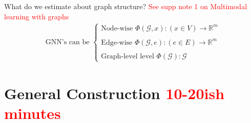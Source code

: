 \documentclass{beamer}
\newcommand{\Graph}{\mathcal{G}}
\newcommand{\NodeSet}{V}
\newcommand{\EdgeSet}{E}
\begin{document}
\begin{frame}{What do we estimate about graph structure?}
    \textcolor{red}{See supp note 1 on Multimodal learning with graphs}
    \begin{gather*}
        \text{GNN's can be }
        \begin{cases}
            \text{Node-wise }\Phi(\Graph, x): (x\in \NodeSet) \rightarrow \mathbb{R}^m 
            \\  \\ 
            \text{Edge-wise }\Phi(\Graph, e): (e\in \EdgeSet) \rightarrow \mathbb{R}^m  
            \\ \\ 
            \text{Graph-level level }\Phi(\Graph): \Graph %
            \end{cases}            
    \end{gather*}
\end{frame}

\section{General Construction \textcolor{red}{10-20ish minutes}}
\end{document}
